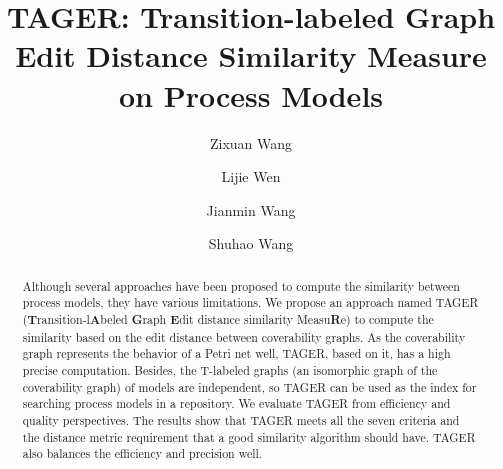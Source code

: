 \documentclass{llncs}
\begin{document}
\frontmatter 
{}

\mainmatter
\title{TAGER: Transition-labeled Graph Edit Distance Similarity Measure on Process Models}

\author[$*$]{Zixuan Wang}
\author[$*$]{Lijie Wen}
\author[$*$]{Jianmin Wang}
\author[$*$]{Shuhao Wang}
\institute{}

\maketitle

\begin{abstract}
Although several approaches have been proposed to compute the similarity between process models, they have various limitations. We propose an approach named TAGER (\textbf{T}ransition-l\textbf{A}beled \textbf{G}raph \textbf{E}dit distance similarity Measu\textbf{R}e) to compute the similarity based on the edit distance between coverability graphs. As the coverability graph represents the behavior of a Petri net well, TAGER, based on it, has a high precise computation. Besides, the T-labeled graphs (an isomorphic graph of the coverability graph) of models are independent, so TAGER can be used as the index for searching process models in a repository. We evaluate TAGER from efficiency and quality perspectives. The results show that TAGER meets all the seven criteria and the distance metric requirement that a good similarity algorithm should have. TAGER also balances the efficiency and precision well.
\end{abstract}
\end{document}
